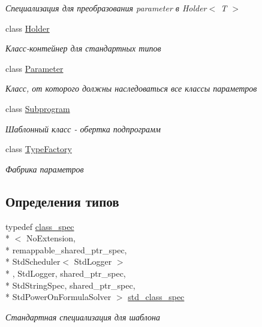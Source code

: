 \begin{DoxyCompactItemize}
\begin{DoxyCompactList}\small\item\em Специализация для преобразования parameter в Holder$<$ T $>$ \end{DoxyCompactList}\item 
class \hyperlink{classLIBKMS__namespace_1_1Holder}{Holder}
\begin{DoxyCompactList}\small\item\em Класс-\/контейнер для стандартных типов \end{DoxyCompactList}\item 
class \hyperlink{classLIBKMS__namespace_1_1Parameter}{Parameter}
\begin{DoxyCompactList}\small\item\em Класс, от которого должны наследоваться все классы параметров \end{DoxyCompactList}\item 
class \hyperlink{classLIBKMS__namespace_1_1Subprogram}{Subprogram}
\begin{DoxyCompactList}\small\item\em Шаблонный класс -\/ обертка подпрограмм \end{DoxyCompactList}\item 
class \hyperlink{classLIBKMS__namespace_1_1TypeFactory}{Type\-Factory}
\begin{DoxyCompactList}\small\item\em Фабрика параметров \end{DoxyCompactList}\end{DoxyCompactItemize}
\subsection*{Определения типов}
\begin{DoxyCompactItemize}
\item 
typedef \hyperlink{structLIBKMS__namespace_1_1class__spec}{class\-\_\-spec}\\*
$<$ No\-Extension, \\*
remappable\-\_\-shared\-\_\-ptr\-\_\-spec, \\*
Std\-Scheduler$<$ Std\-Logger $>$\\*
, Std\-Logger, shared\-\_\-ptr\-\_\-spec, \\*
Std\-String\-Spec, shared\-\_\-ptr\-\_\-spec, \\*
Std\-Power\-On\-Formula\-Solver $>$ \hyperlink{namespaceLIBKMS__namespace_ae7952b6893ea0986997f67d2945fc1a1}{std\-\_\-class\-\_\-spec}
\begin{DoxyCompactList}\small\item\em Стандартная специализация для шаблона \end{DoxyCompactList}\end{DoxyCompactItemize}


